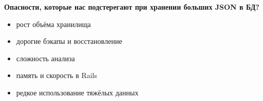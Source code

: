 \begin{frame}
  \bfseries Опасности, которые нас подстерегают при хранении больших JSON в БД?
  \normalfont
  \vspace{1em}
  \begin{itemize}[leftmargin=1em,itemsep=0.7em, label=\RNDSmarker]
    \item рост объёма хранилища
    \item дорогие бэкапы и восстановление
    \item сложность анализа
    \item память и скорость в Rails
    \item редкое использование тяжёлых данных
  \end{itemize}
\end{frame}